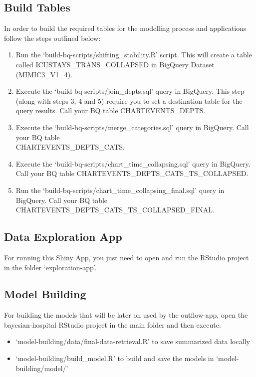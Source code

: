 \documentclass[12pt]{article}
\begin{document}
\subsection*{Build Tables}

In order to build the required tables for the modelling process and applications follow the steps outlined below: 
\begin{enumerate}
	\item  Run the `build-bq-scripts/shifting\_stability.R' script. This will create a table called ICUSTAYS\_TRANS\_COLLAPSED in BigQuery Dataset (MIMIC3\_V1\_4).
	\item Execute the `build-bq-scripts/join\_depts.sql' query in BigQuery. This step (along with steps 3, 4 and 5) require you to set a destination table for the query results. Call your BQ table CHARTEVENTS\_DEPTS.
	\item  Execute the `build-bq-scripts/merge\_categories.sql' query in BigQuery. Call your BQ table \\ CHARTEVENTS\_DEPTS\_CATS.
	\item  Execute the `build-bq-scripts/chart\_time\_collapsing.sql'  query in BigQuery. Call your BQ table CHARTEVENTS\_DEPTS\_CATS\_TS\_COLLAPSED.
	\item  Run the `build-bq-scripts/chart\_time\_collapsing\_final.sql' query in BigQuery. Call your BQ table CHARTEVENTS\_DEPTS\_CATS\_TS\_COLLAPSED\_FINAL.
\end{enumerate} 


\subsection*{Data Exploration App}

For running this Shiny App, you just need to open and run the RStudio project in the folder `exploration-app'.

\subsection*{Model Building}

For building the models that will be later on used by the outflow-app, open the bayesian-hospital RStudio project in the main folder and then execute:

\begin{itemize}
	\item `model-building/data/final-data-retrieval.R' to save summarized data locally 
	\item `model-building/build\_model.R' to build and save the models in `model-building/model/'
\end{itemize} 
\end{document}
